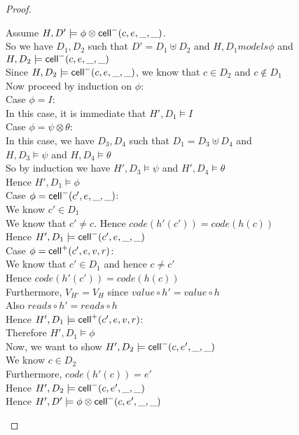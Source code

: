 \begin{proof}
  \begin{tabbedproof}
    \oo Assume $H, D' \models \phi \otimes \mathsf{cell}^{-}({c}, {e}, {\_}, {\_})$. \\
    \ooo So we have $D_1, D_2$ such that $D' = D_1 \uplus D_2$ and $H, D_1 models \phi$ and $H, D_2 \models \mathsf{cell}^{-}({c}, {e}, {\_}, {\_})$ \\
    \ooo Since $H, D_2 \models \mathsf{cell}^{-}({c}, {e}, {\_}, {\_})$, we know that $c \in D_2$ and $c \not\in D_1$ \\
    \ooo Now proceed by induction on $\phi$: \\
    \ooo Case $\phi = I$: \\
    \oooo In this case, it is immediate that $H', D_1 \models I$ \\
    \ooo Case $\phi = \psi \otimes \theta$: \\
    \oooo In this case, we have $D_3, D_4$ such that $D_1 = D_3 \uplus D_4$ and  \\
    \oooox $H, D_3 \models \psi$ and $H, D_4 \models \theta$ \\
    \oooo So by induction we have $H', D_3 \models \psi$ and $H', D_4 \models \theta$ \\
    \oooo Hence $H', D_1 \models \phi$\\
    \ooo Case $\phi = \mathsf{cell}^{-}({c'}, {e}, {\_}, {\_})$: \\
    \oooo We know $c' \in D_1$ \\
    \oooo We know that $c' \not= c$. Hence $\mathit{code}(h'(c')) = \mathit{code}(h(c))$ \\
    \oooo Hence $H', D_1 \models \mathsf{cell}^{-}({c'}, {e}, {\_}, {\_})$ \\
    \ooo Case $\phi = \mathsf{cell}^{+}({c'}, {e}, {v}, {r})$: \\
    \oooo We know that $c' \in D_1$ and hence $c \not= c'$ \\
    \oooo Hence $\mathit{code}(h'(c')) = \mathit{code}(h(c))$ \\
    \oooo Furthermore, $V_{H'} = V_H$ since $\mathit{value} \circ h' = \mathit{value} \circ h$\\
    \oooo Also $\mathit{reads} \circ h' = \mathit{reads} \circ h$ \\
    \oooo Hence $H', D_1 \models \mathsf{cell}^{+}({c'}, {e}, {v}, {r})$: \\
    \ooo Therefore $H', D_1 \models \phi$ \\
    \ooo Now, we want to show $H', D_2 \models \mathsf{cell}^{-}({c}, {e'}, {\_}, {\_})$ \\
    \oooo We know $c \in D_2$ \\
    \oooo Furthermore, $\mathit{code}(h'(c)) = e'$ \\
    \oooo Hence $H', D_2 \models \mathsf{cell}^{-}({c}, {e'}, {\_}, {\_})$ \\
    \ooo Hence $H', D' \models \phi \otimes \mathsf{cell}^{-}({c}, {e'}, {\_}, {\_})$ 
  \end{tabbedproof}
\end{proof}

